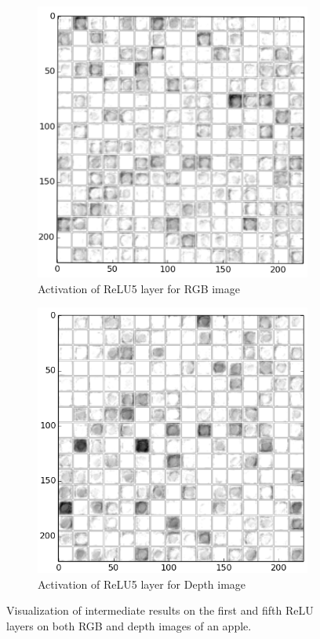 \begin{figure}[htbp]
	\begin{subfigure}[b]{0.45\linewidth}
		\includegraphics[width=\textwidth]{img/relu5_rgb.png}
		\caption{Activation of ReLU5 layer for RGB image}
	\end{subfigure}   	
	\begin{subfigure}[b]{0.45\linewidth}
		\includegraphics[width=\textwidth]{img/relu5_dep.png}
		\caption{Activation of ReLU5 layer for Depth image}
	\end{subfigure}
	\caption{Visualization of intermediate results on the first and fifth ReLU layers on both RGB and depth images of an apple.}
	\label{fig:intermediate_result}
\end{figure}

